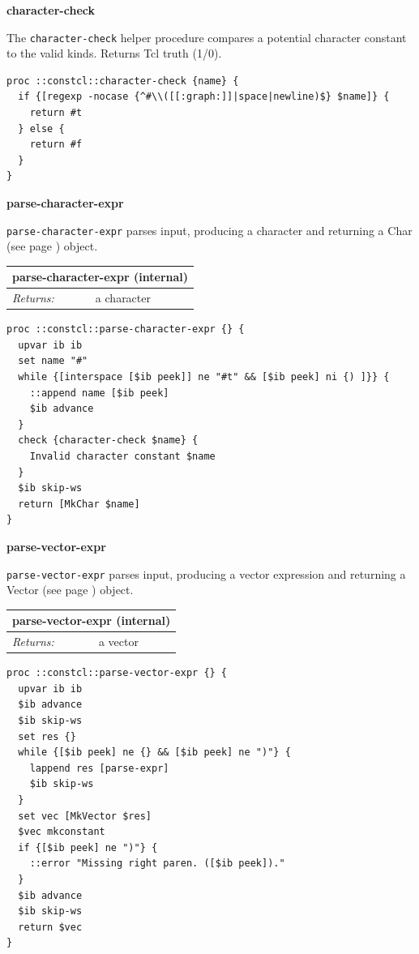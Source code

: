 \documentclass[twoside,9pt]{report}
\begin{document}
\textbf{character-check}


The \texttt{character-check} helper procedure compares a potential character constant to the valid kinds. Returns Tcl truth (1/0).

\noindent\makebox[\linewidth]{\rule{\linewidth}{0.4pt}}
\begin{lstlisting}
proc ::constcl::character-check {name} {
  if {[regexp -nocase {^#\\([[:graph:]]|space|newline)$} $name]} {
    return #t
  } else {
    return #f
  }
}
\end{lstlisting}
\noindent\makebox[\linewidth]{\rule{\linewidth}{0.4pt}}

\textbf{parse-character-expr}


\texttt{parse-character-expr} parses input, producing a character and returning a Char (see page \pageref{characters}) object.

\begin{tabular}{ |l l| }
\hline
\multicolumn{2}{|l|}{parse-character-expr (internal)} \\
\hline
\textit{Returns:} & a character \\
\hline
\end{tabular}

\noindent\makebox[\linewidth]{\rule{\linewidth}{0.4pt}}
\begin{lstlisting}
proc ::constcl::parse-character-expr {} {
  upvar ib ib
  set name "#"
  while {[interspace [$ib peek]] ne "#t" && [$ib peek] ni {) ]}} {
    ::append name [$ib peek]
    $ib advance
  }
  check {character-check $name} {
    Invalid character constant $name
  }
  $ib skip-ws
  return [MkChar $name]
}
\end{lstlisting}
\noindent\makebox[\linewidth]{\rule{\linewidth}{0.4pt}}

\textbf{parse-vector-expr}


\texttt{parse-vector-expr} parses input, producing a vector expression and returning a Vector (see page \pageref{vectors}) object.

\begin{tabular}{ |l l| }
\hline
\multicolumn{2}{|l|}{parse-vector-expr (internal)} \\
\hline
\textit{Returns:} & a vector \\
\hline
\end{tabular}

\noindent\makebox[\linewidth]{\rule{\linewidth}{0.4pt}}
\begin{lstlisting}
proc ::constcl::parse-vector-expr {} {
  upvar ib ib
  $ib advance
  $ib skip-ws
  set res {}
  while {[$ib peek] ne {} && [$ib peek] ne ")"} {
    lappend res [parse-expr]
    $ib skip-ws
  }
  set vec [MkVector $res]
  $vec mkconstant
  if {[$ib peek] ne ")"} {
    ::error "Missing right paren. ([$ib peek])."
  }
  $ib advance
  $ib skip-ws
  return $vec
}
\end{lstlisting}
\noindent\makebox[\linewidth]{\rule{\linewidth}{0.4pt}}
\end{document}

